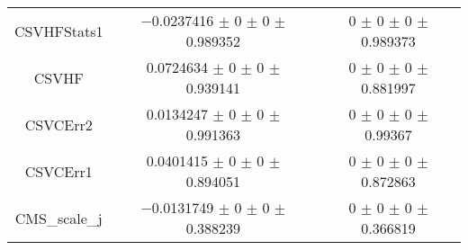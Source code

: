 \begin{table}
\begin{tabular}{ccc}
CSVHFStats1 & \num{-0.0237416} $\pm$ \num{0} $\pm$ \num{0} $\pm$ \num{0.989352} & \num{0} $\pm$ \num{0} $\pm$ \num{0} $\pm$ \num{0.989373}\\
CSVHF & \num{0.0724634} $\pm$ \num{0} $\pm$ \num{0} $\pm$ \num{0.939141} & \num{0} $\pm$ \num{0} $\pm$ \num{0} $\pm$ \num{0.881997}\\
CSVCErr2 & \num{0.0134247} $\pm$ \num{0} $\pm$ \num{0} $\pm$ \num{0.991363} & \num{0} $\pm$ \num{0} $\pm$ \num{0} $\pm$ \num{0.99367}\\
CSVCErr1 & \num{0.0401415} $\pm$ \num{0} $\pm$ \num{0} $\pm$ \num{0.894051} & \num{0} $\pm$ \num{0} $\pm$ \num{0} $\pm$ \num{0.872863}\\
CMS\_scale\_j & \num{-0.0131749} $\pm$ \num{0} $\pm$ \num{0} $\pm$ \num{0.388239} & \num{0} $\pm$ \num{0} $\pm$ \num{0} $\pm$ \num{0.366819}\\
\bottomrule
\end{tabular}
\end{table}